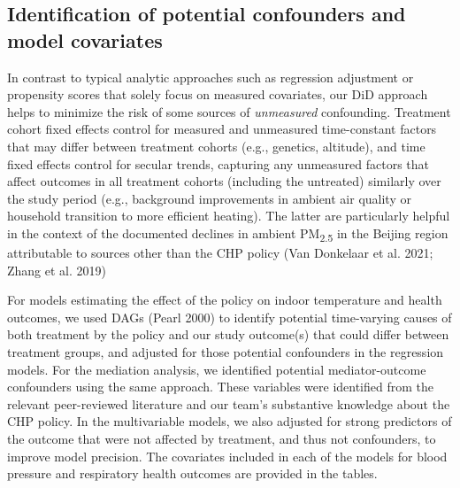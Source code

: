 \documentclass[
  letterpaper,
  DIV=11,
  numbers=noendperiod]{scrartcl}
\begin{document}
\subsection{Identification of potential confounders and model
covariates}\label{identification-of-potential-confounders-and-model-covariates}

In contrast to typical analytic approaches such as regression adjustment
or propensity scores that solely focus on measured covariates, our DiD
approach helps to minimize the risk of some sources of \emph{unmeasured}
confounding. Treatment cohort fixed effects control for measured and
unmeasured time-constant factors that may differ between treatment
cohorts (e.g., genetics, altitude), and time fixed effects control for
secular trends, capturing any unmeasured factors that affect outcomes in
all treatment cohorts (including the untreated) similarly over the study
period (e.g., background improvements in ambient air quality or
household transition to more efficient heating). The latter are
particularly helpful in the context of the documented declines in
ambient PM\textsubscript{2.5} in the Beijing region attributable to
sources other than the CHP policy (Van Donkelaar et al. 2021; Zhang et
al. 2019)

For models estimating the effect of the policy on indoor temperature and
health outcomes, we used DAGs (Pearl 2000) to identify potential
time-varying causes of both treatment by the policy and our study
outcome(s) that could differ between treatment groups, and adjusted for
those potential confounders in the regression models. For the mediation
analysis, we identified potential mediator-outcome confounders using the
same approach. These variables were identified from the relevant
peer-reviewed literature and our team's substantive knowledge about the
CHP policy. In the multivariable models, we also adjusted for strong
predictors of the outcome that were not affected by treatment, and thus
not confounders, to improve model precision. The covariates included in
each of the models for blood pressure and respiratory health outcomes
are provided in the tables.
\end{document}
